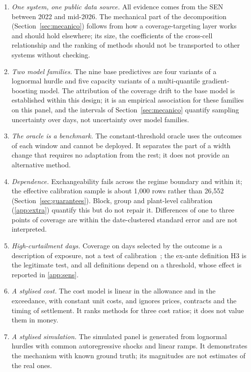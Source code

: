 \begin{enumerate}
\item \emph{One system, one public data source.} All evidence comes from the SEN between 2022 and mid-2026. The mechanical part of the decomposition (Section~\ref{sec:mecanico}) follows from how a coverage-targeting layer works and should hold elsewhere; its size, the coefficients of the cross-cell relationship and the ranking of methods should not be transported to other systems without checking.
\item \emph{Two model families.} The nine base predictives are four variants of a lognormal hurdle and five capacity variants of a multi-quantile gradient-boosting model. The attribution of the coverage drift to the base model is established within this design; it is an empirical association for these families on this panel, and the intervals of Section~\ref{sec:mecanico} quantify sampling uncertainty over days, not uncertainty over model families.
\item \emph{The oracle is a benchmark.} The constant-threshold oracle uses the outcomes of each window and cannot be deployed. It separates the part of a width change that requires no adaptation from the rest; it does not provide an alternative method.
\item \emph{Dependence.} Exchangeability fails across the regime boundary and within it; the effective calibration sample is about 1{,}000 rows rather than 26{,}552 (Section~\ref{sec:guarantees}). Block, group and plant-level calibration (\ref{app:extra}) quantify this but do not repair it. Differences of one to three points of coverage are within the date-clustered standard error and are not interpreted.
\item \emph{High-curtailment days.} Coverage on days selected by the outcome is a description of exposure, not a test of calibration~\cite{lerch2017}; the ex-ante definition H3 is the legitimate test, and all definitions depend on a threshold, whose effect is reported in \ref{app:sens}.
\item \emph{A stylised cost.} The cost model is linear in the allowance and in the exceedance, with constant unit costs, and ignores prices, contracts and the timing of settlement. It ranks methods for three cost ratios; it does not value them in money.
\item \emph{A stylised simulation.} The simulated panel is generated from lognormal hurdles with common autoregressive shocks and linear ramps. It demonstrates the mechanism with known ground truth; its magnitudes are not estimates of the real ones.

\end{enumerate}
